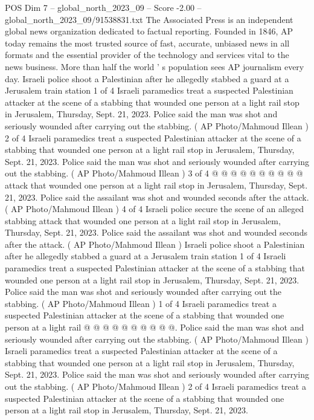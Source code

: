 \begin{textsample}{POS Dim 7 – global\_north\_2023\_09 – Score -2.00 – global\_north\_2023\_09/91538831.txt}  \label{ex:f7_pos_288}
The Associated Press is an independent global news organization dedicated to factual reporting.
Founded in 1846, AP today remains the most trusted source of fast, accurate, unbiased news in all formats and the essential provider of the technology and services vital to the news business.
More than half the world ' s population sees AP journalism every day.
Israeli police shoot a Palestinian after he allegedly stabbed a guard at a Jerusalem train station 1 of 4 Israeli paramedics treat a suspected Palestinian attacker at the scene of a stabbing that wounded one person at a light rail stop in Jerusalem, Thursday, Sept. 21, 2023.
Police said the man was shot and seriously wounded after carrying out the stabbing. ( AP Photo/Mahmoud Illean ) 2 of 4 Israeli paramedics treat a suspected Palestinian attacker at the scene of a stabbing that wounded one person at a light rail stop in Jerusalem, Thursday, Sept. 21, 2023.
Police said the man was shot and seriously wounded after carrying out the stabbing. ( AP Photo/Mahmoud Illean ) 3 of 4 @ @ @ @ @ @ @ @ @ @ attack that wounded one person at a light rail stop in Jerusalem, Thursday, Sept. 21, 2023.
Police said the assailant was shot and wounded seconds after the attack. ( AP Photo/Mahmoud Illean ) 4 of 4 Israeli police secure the scene of an alleged stabbing attack that wounded one person at a light rail stop in Jerusalem, Thursday, Sept. 21, 2023.
Police said the assailant was shot and wounded seconds after the attack. ( AP Photo/Mahmoud Illean ) Israeli police shoot a Palestinian after he allegedly stabbed a guard at a Jerusalem train station 1 of 4 Israeli paramedics treat a suspected Palestinian attacker at the scene of a stabbing that wounded one person at a light rail stop in Jerusalem, Thursday, Sept. 21, 2023.
Police said the man was shot and seriously wounded after carrying out the stabbing. ( AP Photo/Mahmoud Illean ) 1 of 4 Israeli paramedics treat a suspected Palestinian attacker at the scene of a stabbing that wounded one person at a light rail @ @ @ @ @ @ @ @ @ @.
Police said the man was shot and seriously wounded after carrying out the stabbing. ( AP Photo/Mahmoud Illean ) Israeli paramedics treat a suspected Palestinian attacker at the scene of a stabbing that wounded one person at a light rail stop in Jerusalem, Thursday, Sept. 21, 2023.
Police said the man was shot and seriously wounded after carrying out the stabbing. ( AP Photo/Mahmoud Illean ) 2 of 4 Israeli paramedics treat a suspected Palestinian attacker at the scene of a stabbing that wounded one person at a light rail stop in Jerusalem, Thursday, Sept. 21, 2023.

\end{textsample}
